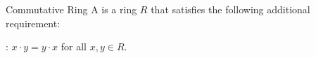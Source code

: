 \documentclass[12pt]{report}
\begin{document}
\begin{dfnbox}{Commutative Ring}
	A  is a ring $R$ that satisfies the following additional requirement:
	\begin{boxitems}
		\item {}: $x \cdot y = y \cdot x$ for all $x, y \in R$.
	\end{boxitems}
\end{dfnbox}
\end{document}
